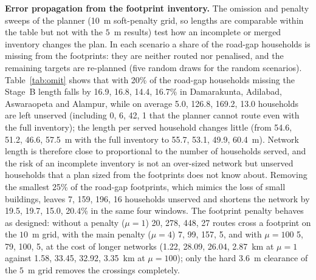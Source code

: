 \documentclass[preprint,12pt]{elsarticle}
\begin{document}
\textbf{Error propagation from the footprint inventory.} The omission and penalty sweeps of the planner (10~m soft-penalty grid, so lengths are comparable within the table but not with the $5$~m results) test how an incomplete or merged inventory changes the plan. In each scenario a share of the road-gap households is missing from the footprints: they are neither routed nor penalised, and the remaining targets are re-planned (five random draws for the random scenarios). Table~\ref{tab:omit} shows that with 20\% of the road-gap households missing the Stage~B length falls by 16.9, 16.8, 14.4, 16.7\% in Damarakunta, Adilabad, Aswaraopeta and Alampur, while on average 5.0, 126.8, 169.2, 13.0 households are left unserved (including 0, 6, 42, 1 that the planner cannot route even with the full inventory); the length per served household changes little (from 54.6, 51.2, 46.6, 57.5~m with the full inventory to 55.7, 53.1, 49.9, 60.4~m). Network length is therefore close to proportional to the number of households served, and the risk of an incomplete inventory is not an over-sized network but unserved households that a plan sized from the footprints does not know about. Removing the smallest 25\% of the road-gap footprints, which mimics the loss of small buildings, leaves 7, 159, 196, 16 households unserved and shortens the network by 19.5, 19.7, 15.0, 20.4\% in the same four windows. The footprint penalty behaves as designed: without a penalty ($\mu=1$) 20, 278, 448, 27 routes cross a footprint on the $10$~m grid, with the main penalty ($\mu=4$) 7, 99, 157, 5, and with $\mu=100$ 5, 79, 100, 5, at the cost of longer networks (1.22, 28.09, 26.04, 2.87~km at $\mu=1$ against 1.58, 33.45, 32.92, 3.35~km at $\mu=100$); only the hard $3.6$~m clearance of the $5$~m grid removes the crossings completely.
\end{document}
